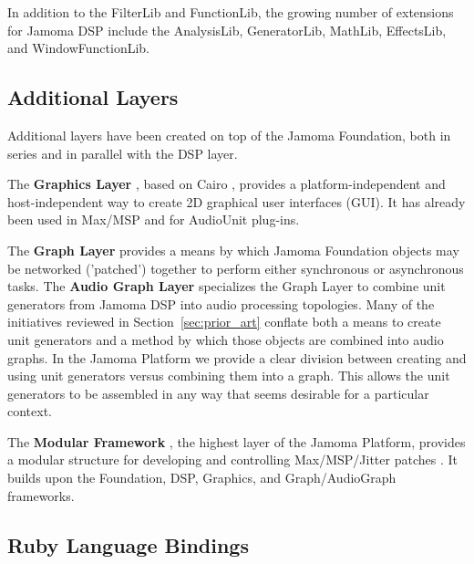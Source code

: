 \documentclass[twoside,10pt]{article}
\begin{document}
In addition to the FilterLib and FunctionLib, the growing number of extensions for Jamoma DSP include the AnalysisLib, GeneratorLib, MathLib, EffectsLib, and WindowFunctionLib.




\subsection{Additional Layers} %

Additional layers have been created on top of the Jamoma Foundation, both in series and in parallel with the DSP layer.  

The \textbf{Graphics Layer} \cite{web10}, based on Cairo \cite{web11}, provides a platform-independent and host-independent way to create 2D graphical user interfaces (GUI). It has already been used in Max/MSP and for AudioUnit plug-ins.

The \textbf{Graph Layer} provides a means by which Jamoma Foundation objects may be networked ('patched') together to perform either synchronous or asynchronous tasks.  The \textbf{Audio Graph Layer} \cite{web12} specializes the Graph Layer to combine unit generators from Jamoma DSP into audio processing topologies.  Many of the initiatives reviewed in Section~\ref{sec:prior_art} conflate both a means to create unit generators and a method by which those objects are combined into audio graphs.  In the Jamoma Platform we provide a clear division between creating and using unit generators versus combining them into a graph.  This allows the unit generators to be assembled in any way that seems desirable for a particular context.

The \textbf{Modular Framework} \cite{web13}, the highest layer of the Jamoma Platform, provides a modular structure for developing  and controlling Max/MSP/Jitter patches \cite{Place:2006}. It builds upon the Foundation, DSP, Graphics, and Graph/AudioGraph frameworks.



\subsection{Ruby Language Bindings} %
\end{document}
